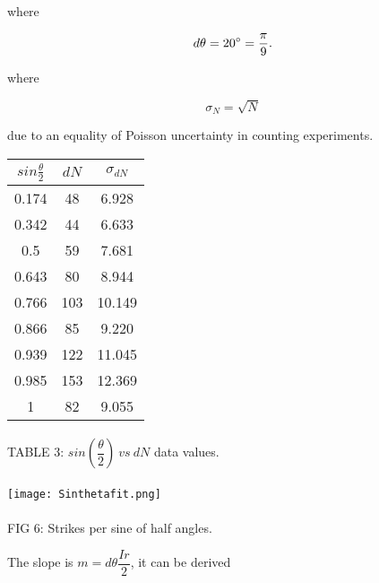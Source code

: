 \documentclass[a4paper]{article}
\begin{document}
\begin{multicols}{2}
where 

\begin{displaymath}
d\theta = 20 \degree = \dfrac{\pi}{9}.
\end{displaymath}

where

\begin{equation}
\sigma_N = \sqrt{N}
\end{equation}

due to an equality of Poisson uncertainty in counting experiments.

\begin{center}

\begin{tabular}{ccc}
\hline
$sin\frac{\theta}{2}$  & $dN$   & $\sigma_{dN}$  \\ \hline
0.174 & 48  & 6.928  \\ \hline
0.342 & 44  & 6.633  \\ \hline
0.5   & 59  & 7.681  \\ \hline
0.643 & 80  & 8.944  \\ \hline
0.766 & 103 & 10.149 \\ \hline
0.866 & 85  & 9.220  \\ \hline
0.939 & 122 & 11.045 \\ \hline
0.985 & 153 & 12.369 \\ \hline
1     & 82  & 9.055  \\ \hline
\end{tabular}

\paragraph{}
TABLE 3: $sin(\dfrac{\theta}{2}) \ vs \ dN$ data values.

\paragraph{}

\texttt{[image: Sinthetafit.png]} 

\paragraph{}

FIG 6: Strikes per sine of half angles.

\end{center}

The slope is $m = d\theta \dfrac{Ir}{2}$, it can be derived


\end{multicols}
\end{document}

